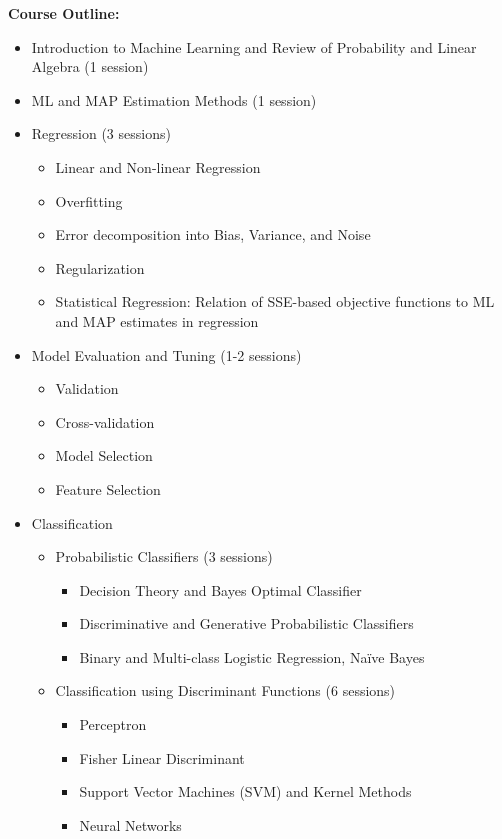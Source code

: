 \documentclass[12pt]{article}
\begin{document}
\textbf{Course Outline:}
\begin{itemize}
    \item Introduction to Machine Learning and Review of Probability and Linear Algebra (1 session)
    \item ML and MAP Estimation Methods (1 session)
    \item Regression (3 sessions)
    \begin{itemize}
        \item Linear and Non-linear Regression
        \item Overfitting
        \item Error decomposition into Bias, Variance, and Noise
        \item Regularization
        \item Statistical Regression: Relation of SSE-based objective functions to ML and MAP estimates in regression
    \end{itemize}
    \item Model Evaluation and Tuning (1-2 sessions)
    \begin{itemize}
        \item Validation
        \item Cross-validation
        \item Model Selection
        \item Feature Selection
    \end{itemize}
    \item Classification
    \begin{itemize}
        \item Probabilistic Classifiers (3 sessions)
        \begin{itemize}
            \item Decision Theory and Bayes Optimal Classifier
            \item Discriminative and Generative Probabilistic Classifiers
            \item Binary and Multi-class Logistic Regression, Naïve Bayes
        \end{itemize}
        \item Classification using Discriminant Functions (6 sessions)
        \begin{itemize}
            \item Perceptron
            \item Fisher Linear Discriminant
            \item Support Vector Machines (SVM) and Kernel Methods
            \item Neural Networks

\end{itemize}
\end{itemize}
\end{itemize}
\end{document}
